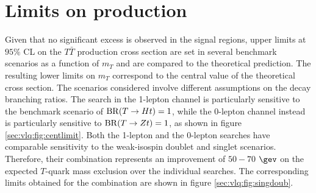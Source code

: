 \section[Limits on $T\bar{T}$ production]{Limits on  production}
Given that no significant excess is observed in the signal regions, upper limits at $95\%$ CL on the $T\bar{T}$  production cross section are set in several benchmark scenarios as a function of $m_{T}$ and are compared to the theoretical prediction.
The resulting lower limits on $m_{T}$ correspond to the central value of the theoretical cross section. The scenarios considered involve different assumptions on the decay branching ratios. The search in the 1-lepton channel is particularly sensitive to the benchmark scenario of ${\rm BR}(T\to Ht )=1$, while the 0-lepton channel instead is particularly sensitive to ${\rm BR}(T\to Zt )=1$, as shown in figure \ref{sec:vlq:fig:centlimit}. Both the 1-lepton and the 0-lepton searches have comparable sensitivity to the weak-isospin doublet and singlet scenarios. Therefore, their combination represents an improvement of $50-70$ $\gev$ on the expected $T$-quark mass exclusion over the individual searches. The corresponding limits obtained for the combination are shown in figure \ref{sec:vlq:fig:singdoub}.



